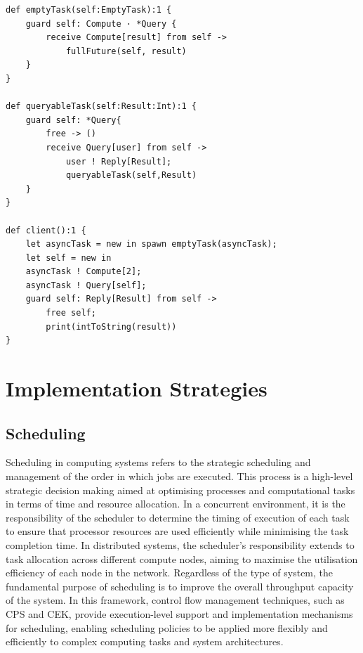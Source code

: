 \documentclass{l4proj}
\begin{document}
\begin{lstlisting}[caption={Implementing Concurrent Program for Asynchronous Task Processing and Result Querying}, label={lst:patexample2}]
def emptyTask(self:EmptyTask):1 {
    guard self: Compute · *Query {
        receive Compute[result] from self -> 
            fullFuture(self, result)
    }
}

def queryableTask(self:Result:Int):1 {
    guard self: *Query{
        free -> ()
        receive Query[user] from self ->
            user ! Reply[Result];
            queryableTask(self,Result)
    }
}

def client():1 {
    let asyncTask = new in spawn emptyTask(asyncTask);
    let self = new in 
    asyncTask ! Compute[2];
    asyncTask ! Query[self];
    guard self: Reply[Result] from self ->
        free self;
        print(intToString(result))
}

\end{lstlisting}

\section{Implementation Strategies}

\subsection{Scheduling}
Scheduling in computing systems refers to the strategic scheduling and management of the order in which jobs are executed. This process is a high-level strategic decision making aimed at optimising processes and computational tasks in terms of time and resource allocation. In a concurrent environment, it is the responsibility of the scheduler to determine the timing of execution of each task to ensure that processor resources are used efficiently while minimising the task completion time. In distributed systems, the scheduler's responsibility extends to task allocation across different compute nodes, aiming to maximise the utilisation efficiency of each node in the network. Regardless of the type of system, the fundamental purpose of scheduling is to improve the overall throughput capacity of the system. In this framework, control flow management techniques, such as CPS and CEK, provide execution-level support and implementation mechanisms for scheduling, enabling scheduling policies to be applied more flexibly and efficiently to complex computing tasks and system architectures.
\end{document}
